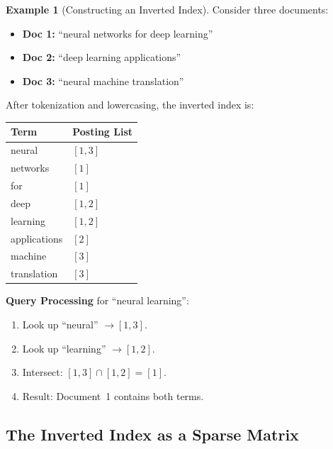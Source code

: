 \documentclass[11pt,a4paper]{article}
\theoremstyle{definition}
\newtheorem{example}{Example}[section]
\theoremstyle{plain}
\begin{document}
\begin{example}[Constructing an Inverted Index]
\label{ex:inverted-index}
Consider three documents:
\begin{itemize}[nosep]
    \item \textbf{Doc 1:} ``neural networks for deep learning''
    \item \textbf{Doc 2:} ``deep learning applications''
    \item \textbf{Doc 3:} ``neural machine translation''
\end{itemize}

\begin{center}

\end{center}

After tokenization and lowercasing, the inverted index is:

\begin{center}
\begin{tabular}{ll}
\toprule
\textbf{Term} & \textbf{Posting List} \\
\midrule
neural & $[1, 3]$ \\
networks & $[1]$ \\
for & $[1]$ \\
deep & $[1, 2]$ \\
learning & $[1, 2]$ \\
applications & $[2]$ \\
machine & $[3]$ \\
translation & $[3]$ \\
\bottomrule
\end{tabular}
\end{center}

\textbf{Query Processing} for ``neural learning'':
\begin{enumerate}[nosep]
    \item Look up ``neural'' $\to [1, 3]$.
    \item Look up ``learning'' $\to [1, 2]$.
    \item Intersect: $[1, 3] \cap [1, 2] = [1]$.
    \item Result: Document~1 contains both terms.
\end{enumerate}
\end{example}

\subsection{The Inverted Index as a Sparse Matrix}
\end{document}
